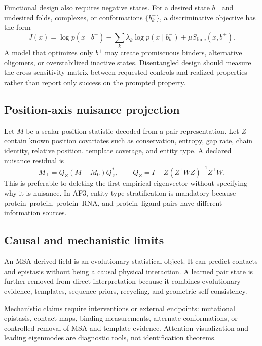 \documentclass[10pt]{article}
\begin{document}
Functional design also requires negative states.  For a desired state $b^+$ and undesired folds,
complexes, or conformations $\{b_k^-\}$, a discriminative objective has the form
\begin{equation}
J(x)
=\log p(x\mid b^+)
-\sum_k\lambda_k\log p(x\mid b_k^-)
+\mu S_{\mathrm{func}}(x,b^+).
\label{eq:positive-negative-design}
\end{equation}
A model that optimizes only $b^+$ may create promiscuous binders, alternative oligomers, or
overstabilized inactive states.  Disentangled design should measure the cross-sensitivity matrix
between requested controls and realized properties rather than report only success on the prompted
property.

\subsection{Position-axis nuisance projection}

Let $M$ be a scalar position statistic decoded from a pair representation.  Let $Z$ contain known
position covariates such as conservation, entropy, gap rate, chain identity, relative position,
template coverage, and entity type.  A declared nuisance residual is
\begin{equation}
M_{\perp}
=Q_Z(M-M_0)Q_Z^*,
\qquad
Q_Z=I-Z(Z^{\mathsf T}WZ)^{-1}Z^{\mathsf T}W.
\label{eq:position-residual}
\end{equation}
This is preferable to deleting the first empirical eigenvector without specifying why it is
nuisance.  In AF3, entity-type stratification is mandatory because protein--protein,
protein--RNA, and protein--ligand pairs have different information sources.

\subsection{Causal and mechanistic limits}

An MSA-derived field is an evolutionary statistical object.  It can predict contacts and
epistasis without being a causal physical interaction.  A learned pair state is further removed
from direct interpretation because it combines evolutionary evidence, templates, sequence priors,
recycling, and geometric self-consistency.

Mechanistic claims require interventions or external endpoints: mutational epistasis, contact
maps, binding measurements, alternate conformations, or controlled removal of MSA and template
evidence.  Attention visualization and leading eigenmodes are diagnostic tools, not identification
theorems.
\end{document}
